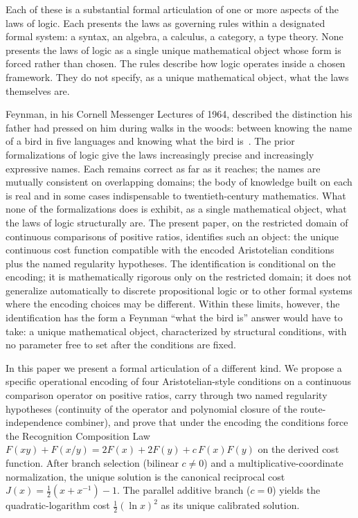 \documentclass[11pt,a4paper]{article}
\theoremstyle{definition}
\theoremstyle{remark}
\begin{document}
Each of these is a substantial formal articulation of one or more aspects of
the laws of logic. Each presents the laws as governing rules within a
designated formal system: a syntax, an algebra, a calculus, a category, a
type theory. None presents the laws of logic as a single unique mathematical
object whose form is forced rather than chosen. The rules describe how
logic operates inside a chosen framework. They do not specify, as a unique
mathematical object, what the laws themselves are.

Feynman, in his Cornell Messenger Lectures of 1964, described the
distinction his father had pressed on him during walks in the woods:
between knowing the name of a bird in five languages and knowing what
the bird is~\cite{Feynman1964}. The prior formalizations of logic give
the laws increasingly precise and increasingly expressive names. Each
remains correct as far as it reaches; the names are mutually consistent
on overlapping domains; the body of knowledge built on each is real and
in some cases indispensable to twentieth-century mathematics. What none
of the formalizations does is exhibit, as a single mathematical
object, what the laws of logic structurally are. The present paper, on
the restricted domain of continuous comparisons of positive ratios,
identifies such an object: the unique continuous cost function
compatible with the encoded Aristotelian conditions plus the named
regularity hypotheses. The identification is conditional on the
encoding; it is mathematically rigorous only on the restricted domain;
it does not generalize automatically to discrete propositional logic or
to other formal systems where the encoding choices may be different.
Within these limits, however, the identification has the form a Feynman
``what the bird is'' answer would have to take: a unique mathematical
object, characterized by structural conditions, with no parameter free
to set after the conditions are fixed.

In this paper we present a formal articulation of a different kind. We
propose a specific operational encoding of four Aristotelian-style
conditions on a continuous comparison operator on positive ratios, carry
through two named regularity hypotheses (continuity of the operator and
polynomial closure of the route-independence combiner), and prove that
under the encoding the conditions force the Recognition Composition Law
$F(xy) + F(x/y) = 2F(x) + 2F(y) + c\,F(x)F(y)$ on the derived cost
function. After branch selection (bilinear $c \neq 0$) and a
multiplicative-coordinate normalization, the unique solution is the
canonical reciprocal cost $J(x) = \tfrac{1}{2}(x + x^{-1}) - 1$. The
parallel additive branch ($c = 0$) yields the quadratic-logarithm cost
$\tfrac{1}{2}(\ln x)^2$ as its unique calibrated solution.
\end{document}

